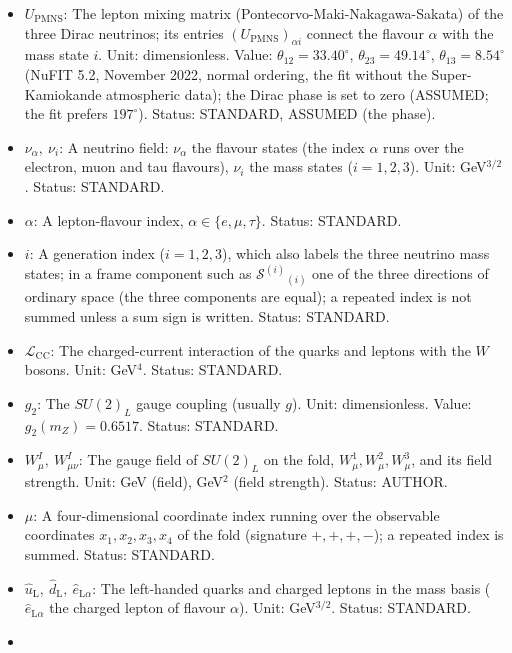 \documentclass[
  10pt,
]{article}
\begin{document}
\begin{itemize}
\item
  \(U_{\mathrm{PMNS}}\): The lepton mixing matrix
  (Pontecorvo-Maki-Nakagawa-Sakata) of the three Dirac neutrinos; its
  entries \((U_{\mathrm{PMNS}})_{\alpha i}\) connect the flavour
  \(\alpha\) with the mass state \(i\). Unit: dimensionless. Value:
  \(\theta_{12} = 33.40^\circ\), \(\theta_{23} = 49.14^\circ\),
  \(\theta_{13} = 8.54^\circ\) (NuFIT 5.2, November 2022, normal
  ordering, the fit without the Super-Kamiokande atmospheric data); the
  Dirac phase is set to zero (ASSUMED; the fit prefers \(197^\circ\)).
  Status: STANDARD, ASSUMED (the phase).
\item
  \(\nu_\alpha,\ \nu_i\): A neutrino field: \(\nu_\alpha\) the flavour
  states (the index \(\alpha\) runs over the electron, muon and tau
  flavours), \(\nu_i\) the mass states (\(i = 1, 2, 3\)). Unit:
  GeV\(^{3/2}\). Status: STANDARD.
\item
  \(\alpha\): A lepton-flavour index, \(\alpha \in \{e, \mu, \tau\}\).
  Status: STANDARD.
\item
  \(i\): A generation index (\(i = 1, 2, 3\)), which also labels the
  three neutrino mass states; in a frame component such as
  \(\mathcal{S}^{(i)}{}_{(i)}\) one of the three directions of ordinary
  space (the three components are equal); a repeated index is not summed
  unless a sum sign is written. Status: STANDARD.
\item
  \(\mathcal{L}_{\mathrm{CC}}\): The charged-current interaction of the
  quarks and leptons with the \(W\) bosons. Unit: GeV\(^4\). Status:
  STANDARD.
\item
  \(g_2\): The \(SU(2)_L\) gauge coupling (usually \(g\)). Unit:
  dimensionless. Value: \(g_2(m_Z) = 0.6517\). Status: STANDARD.
\item
  \(W^I_\mu,\ W^I_{\mu\nu}\): The gauge field of \(SU(2)_L\) on the
  fold, \(W^1_\mu, W^2_\mu, W^3_\mu\), and its field strength. Unit: GeV
  (field), GeV\(^2\) (field strength). Status: AUTHOR.
\item
  \(\mu\): A four-dimensional coordinate index running over the
  observable coordinates \(x_1, x_2, x_3, x_4\) of the fold (signature
  \(+,+,+,-\)); a repeated index is summed. Status: STANDARD.
\item
  \(\hat u_{\mathrm{L}},\ \hat d_{\mathrm{L}},\ \hat e_{\mathrm{L}\alpha}\):
  The left-handed quarks and charged leptons in the mass basis
  (\(\hat e_{\mathrm{L}\alpha}\) the charged lepton of flavour
  \(\alpha\)). Unit: GeV\(^{3/2}\). Status: STANDARD.
\item

\end{itemize}
\end{document}
